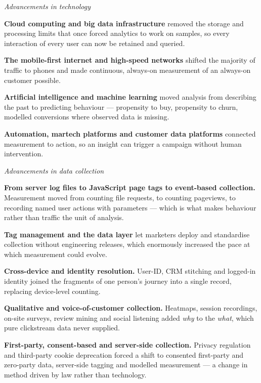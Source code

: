 \begin{qlist}
\textit{Advancements in technology}
\begin{apts}
\item \textbf{Cloud computing and big data infrastructure} removed the storage
      and processing limits that once forced analytics to work on samples, so
      every interaction of every user can now be retained and queried.
\item \textbf{The mobile-first internet and high-speed networks} shifted the
      majority of traffic to phones and made continuous, always-on measurement
      of an always-on customer possible.
\item \textbf{Artificial intelligence and machine learning} moved analysis from
      describing the past to predicting behaviour --- propensity to buy,
      propensity to churn, modelled conversions where observed data is missing.
\item \textbf{Automation, martech platforms and customer data platforms}
      connected measurement to action, so an insight can trigger a campaign
      without human intervention.
\end{apts}

\textit{Advancements in data collection}
\begin{apts}\setcounter{enumi}{4}
\item \textbf{From server log files to JavaScript page tags to event-based
      collection.} Measurement moved from counting file requests, to counting
      pageviews, to recording named user actions with parameters --- which is
      what makes behaviour rather than traffic the unit of analysis.
\item \textbf{Tag management and the data layer} let marketers deploy and
      standardise collection without engineering releases, which
      enormously increased the pace at which measurement could evolve.
\item \textbf{Cross-device and identity resolution.} User-ID, CRM stitching and
      logged-in identity joined the fragments of one person's journey into a
      single record, replacing device-level counting.
\item \textbf{Qualitative and voice-of-customer collection.} Heatmaps, session
      recordings, on-site surveys, review mining and social listening added
      \emph{why} to the \emph{what}, which pure clickstream data never
      supplied.
\item \textbf{First-party, consent-based and server-side collection.} Privacy
      regulation and third-party cookie deprecation forced a shift to
      consented first-party and zero-party data, server-side tagging and
      modelled measurement --- a change in method driven by law rather than
      technology.
\end{apts}


\end{qlist}
